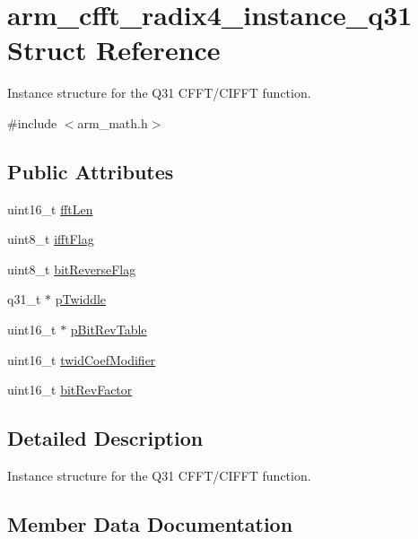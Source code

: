 \hypertarget{structarm__cfft__radix4__instance__q31}{}\section{arm\+\_\+cfft\+\_\+radix4\+\_\+instance\+\_\+q31 Struct Reference}
\label{structarm__cfft__radix4__instance__q31}


Instance structure for the Q31 C\+F\+F\+T/\+C\+I\+F\+FT function.  




{\ttfamily \#include $<$arm\+\_\+math.\+h$>$}

\subsection*{Public Attributes}
\begin{DoxyCompactItemize}
\item 
uint16\+\_\+t \hyperlink{structarm__cfft__radix4__instance__q31_ab413d2a5d3f45fa187d93813bf3bf81b}{fft\+Len}
\item 
uint8\+\_\+t \hyperlink{structarm__cfft__radix4__instance__q31_adc0a62ba669ad2282ecbe43d5d96abab}{ifft\+Flag}
\item 
uint8\+\_\+t \hyperlink{structarm__cfft__radix4__instance__q31_a5a7c4f4c7b3fb655cbb2bc11ef160a2a}{bit\+Reverse\+Flag}
\item 
q31\+\_\+t $\ast$ \hyperlink{structarm__cfft__radix4__instance__q31_a561c22dee4cbdcfa0fd5f15106ecc306}{p\+Twiddle}
\item 
uint16\+\_\+t $\ast$ \hyperlink{structarm__cfft__radix4__instance__q31_a33a3bc774c97373261699463c05dfe54}{p\+Bit\+Rev\+Table}
\item 
uint16\+\_\+t \hyperlink{structarm__cfft__radix4__instance__q31_a8cf8187b8232815cf17ee82bf572ecf9}{twid\+Coef\+Modifier}
\item 
uint16\+\_\+t \hyperlink{structarm__cfft__radix4__instance__q31_a94d2fead4efa4d5eaae142bbe30b0e15}{bit\+Rev\+Factor}
\end{DoxyCompactItemize}


\subsection{Detailed Description}
Instance structure for the Q31 C\+F\+F\+T/\+C\+I\+F\+FT function. 

\subsection{Member Data Documentation}
